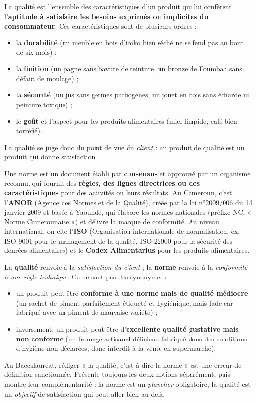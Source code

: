 \documentclass[11pt]{article}
\newcommand{\cle}[1]{{\popxbold\color{popdark}#1}}
\begin{document}
\begin{definition}[La qualité]
La \cle{qualité} est l'ensemble des caractéristiques d'un produit qui lui confèrent l'\textbf{aptitude à satisfaire les besoins exprimés ou implicites du consommateur}. Ces caractéristiques sont de plusieurs ordres :
\begin{itemize}
\item la \textbf{durabilité} (un meuble en bois d'iroko bien séché ne se fend pas au bout de six mois) ;
\item la \textbf{finition} (un pagne sans bavure de teinture, un bronze de Foumban sans défaut de moulage) ;
\item la \textbf{sécurité} (un jus sans germes pathogènes, un jouet en bois sans écharde ni peinture toxique) ;
\item le \textbf{goût} et l'aspect pour les produits alimentaires (miel limpide, café bien torréfié).
\end{itemize}
La qualité se juge donc du point de vue du \emph{client} : un produit de qualité est un produit qui donne satisfaction.
\end{definition}

\begin{definition}[La norme]
Une \cle{norme} est un document établi par \textbf{consensus} et approuvé par un organisme reconnu, qui fournit des \textbf{règles, des lignes directrices ou des caractéristiques} pour des activités ou leurs résultats. Au Cameroun, c'est l'\textbf{ANOR} (Agence des Normes et de la Qualité), créée par la loi n°2009/006 du 14 janvier 2009 et basée à Yaoundé, qui élabore les normes nationales (préfixe NC, « Norme Camerounaise ») et délivre la marque de conformité. Au niveau international, on cite l'\textbf{ISO} (Organisation internationale de normalisation, ex. ISO 9001 pour le management de la qualité, ISO 22000 pour la sécurité des denrées alimentaires) et le \textbf{Codex Alimentarius} pour les produits alimentaires.
\end{definition}

\begin{attention}
La \textbf{qualité} renvoie à la \emph{satisfaction du client} ; la \textbf{norme} renvoie à la \emph{conformité à une règle technique}. Ce ne sont pas des synonymes :
\begin{itemize}
\item un produit peut être \textbf{conforme à une norme mais de qualité médiocre} (un sachet de piment parfaitement étiqueté et hygiénique, mais fade car fabriqué avec un piment de mauvaise variété) ;
\item inversement, un produit peut être d'\textbf{excellente qualité gustative mais non conforme} (un fromage artisanal délicieux fabriqué dans des conditions d'hygiène non déclarées, donc interdit à la vente en supermarché).
\end{itemize}
Au Baccalauréat, rédiger « la qualité, c'est-à-dire la norme » est une erreur de définition sanctionnée. Présente toujours les deux notions séparément, puis montre leur complémentarité : la norme est un \emph{plancher} obligatoire, la qualité est un \emph{objectif} de satisfaction qui peut aller bien au-delà.
\end{attention}
\end{document}
